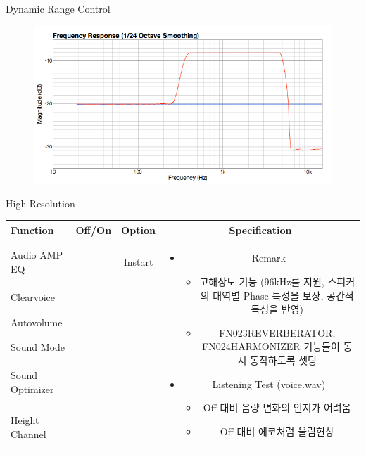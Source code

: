 \documentclass{beamer}
\begin{document}
\begin{frame}[t]{Dynamic Range Control}
		\begin{figure}[b]
			\includegraphics[height=0.32\textwidth]{figure/drc.png}
		\end{figure}
		
	\end{frame}
	
	
	\begin{frame}[t]{High Resolution}
		\begin{tiny}
			\begin{tabular}{@{}lccc@{}}
				\toprule
				Function & Off/On & Option & Specification \\
				\midrule
				Audio AMP EQ & \color{black}{Off} & Instart &
				\multirow{14}{60mm}{
					\begin{itemize}
						\item Remark
						\begin{itemize}
							\item 고해상도 기능 (96kHz를 지원, 스피커의 대역별 Phase 특성을 보상, 공간적 특성을 반영)
							\item FN023REVERBERATOR, FN024HARMONIZER 기능들이 동시 동작하도록 셋팅
						\end{itemize}
						\item Listening Test (voice.wav)
						\begin{itemize}
							\item Off 대비 음량 변화의 인지가 어려움
							\item Off 대비 에코처럼 울림현상
						\end{itemize}
					\end{itemize}
				} \\
				Clearvoice & \color{black}{Off} & & \\
				Autovolume & \color{black}{Off} & & \\
				Sound Mode & \color{black}{Off} & & \\
				Sound Optimizer & \color{black}{Off} & & \\
				Height Channel & \color{black}{Off} & & \\

\end{tabular}
\end{tiny}
\end{frame}
\end{document}
